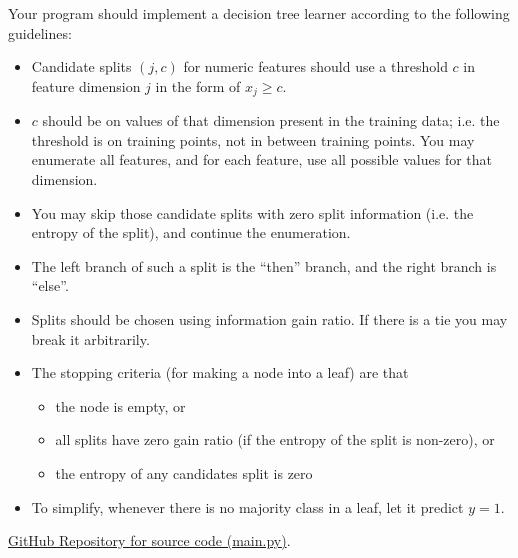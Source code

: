 \documentclass[a4paper]{article}
\theoremstyle{definition}
\newenvironment{soln}{
    \leavevmode\color{blue}\ignorespaces
}{}
\begin{document}
Your program should implement a decision tree learner according to the following guidelines:
\begin{itemize}
\item Candidate splits $(j,c)$ for numeric features should use a threshold $c$ in feature dimension $j$ in the form of $x_{j}\ge c$.
\item $c$ should be on values of that dimension present in the training data; i.e. the threshold is on training points, not in between training points. You may enumerate all features, and for each feature, use all possible values for that dimension.
\item You may skip those candidate splits with zero split information (i.e. the entropy of the split), and continue the enumeration.
\item The left branch of such a split is the ``then'' branch, and the right branch is ``else''.
\item Splits should be chosen using information gain ratio. If there is a tie you may break it arbitrarily.
\item The stopping criteria (for making a node into a leaf) are that 
	\begin{itemize}
	\item the node is empty, or
	\item all splits have zero gain ratio (if the entropy of the split is non-zero), or
	\item the entropy of any candidates split is zero
	\end{itemize}
\item To simplify, whenever there is no majority class in a leaf, let it predict $y=1$.
\end{itemize}
\begin{soln}
    \href{https://github.com/poonlucas/CS760/tree/21948bf945f4ede31e6600ef4051e8666d72e39b/HW2}{GitHub Repository for source code (main.py)}.
\end{soln}
\end{document}
